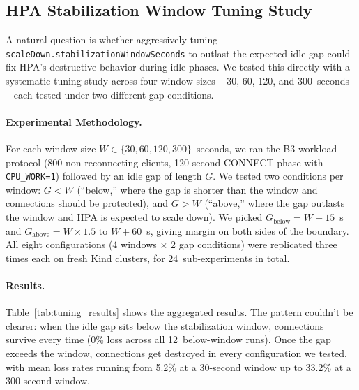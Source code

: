 \documentclass[twocolumn]{svjour3}
\begin{document}
\subsection{HPA Stabilization Window Tuning Study}
\label{sec:tuning_study}

A natural question is whether aggressively tuning
\texttt{scaleDown.stabilizationWindowSeconds} to outlast the expected idle gap
could fix HPA's destructive behavior during idle phases. We tested this directly
with a systematic tuning study across four window sizes -- 30, 60, 120, and
300~seconds -- each tested under two different gap conditions.

\paragraph{Experimental Methodology.}
For each window size $W \in \{30, 60, 120, 300\}$~seconds, we ran the B3 workload
protocol (800 non-reconnecting clients, 120-second CONNECT phase with
\texttt{CPU\_WORK=1}) followed by an idle gap of length $G$. We tested two
conditions per window: $G < W$ (``below,'' where the gap is shorter than the
window and connections should be protected), and $G > W$ (``above,'' where the gap
outlasts the window and HPA is expected to scale down). We picked
$G_{\text{below}} = W - 15$~s and $G_{\text{above}} = W \times 1.5$ to $W + 60$~s,
giving margin on both sides of the boundary. All eight configurations (4 windows
$\times$ 2 gap conditions) were replicated three times each on fresh Kind
clusters, for 24~sub-experiments in total.

\paragraph{Results.}
Table~\ref{tab:tuning_results} shows the aggregated results. The pattern couldn't
be clearer: when the idle gap sits below the stabilization window, connections
survive every time (0\% loss across all 12~below-window runs). Once the gap
exceeds the window, connections get destroyed in every configuration we tested,
with mean loss rates running from 5.2\% at a 30-second window up to 33.2\% at a
300-second window.
\end{document}
